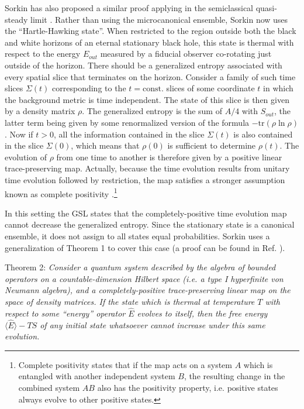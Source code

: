 \documentclass{article}
\begin{document}
Sorkin has also proposed a similar proof applying in the semiclassical quasi-steady limit \cite{sorkin98}.  Rather than using the microcanonical ensemble, Sorkin now uses the ``Hartle-Hawking state''.  When restricted to the region outside both the black and white horizons of an eternal stationary black hole, this state is thermal with respect to the energy $E_{out}$ measured by a fiducial observer co-rotating just outside of the horizon.  There should be a generalized entropy associated with every spatial slice that terminates on the horizon.  Consider a family of such time slices $\Sigma(t)$ corresponding to the $t = \mathrm{const.}$ slices of some coordinate $t$ in which the background metric is time independent.  The state of this slice is then given by a density matrix $\rho$.  The generalized entropy is the sum of $A/4$ with $S_{out}$, the latter term being given by some renormalized version of the formula $-\mathrm{tr}(\rho \ln \rho)$.  Now if $t > 0$, all the information contained in the slice $\Sigma(t)$ is also contained in the slice $\Sigma(0)$, which means that $\rho(0)$ is sufficient to determine $\rho(t)$.  The evolution of $\rho$ from one time to another is therefore given by a positive linear trace-preserving map.  Actually, because the time evolution results from unitary time evolution followed by restriction, the map satisfies a stronger assumption known as complete positivity \cite{lindblad75}.\footnote{Complete positivity states that if the map acts on a system $A$ which is entangled with another independent system $B$, the resulting change in the combined system $AB$ also has the positivity property, i.e. positive states always evolve to other positive states.} 

In this setting the GSL states that the completely-positive time evolution map cannot decrease the generalized entropy.  Since the stationary state is a canonical ensemble, it does not assign to all states equal probabilities.  Sorkin uses a generalization of Theorem 1 to cover this case (a proof can be found in Ref. \cite{lindblad75}).

Theorem 2: \emph{Consider a quantum system described by the algebra of bounded operators on a countable-dimension Hilbert space (i.e. a type I hyperfinite von Neumann algebra), and a completely-positive trace-preserving linear map on the space of density matrices.  If the state which is thermal at temperature $T$ with respect to some ``energy'' operator $\hat{E}$ evolves to itself, then the free energy $\langle \hat{E} \rangle - TS$ of any initial state whatsoever cannot increase under this same evolution.}
\end{document}
